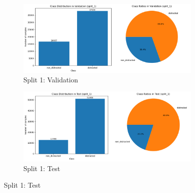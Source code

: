 \begin{figure}[htbp]
    \begin{subfigure}[b]{0.45\textwidth}
        \includegraphics[width=\textwidth]{Images_Thesis/class_distribution_Kinect_color/split_1_rgb_daa/class_dist_val_sp_1_rgb_daa.png}
        \caption{Split 1: Validation}
        \label{fig:Class_dist_grid_image5}
    \end{subfigure}
    \hfill
    \begin{subfigure}[b]{0.45\textwidth}
        \includegraphics[width=\textwidth]{Images_Thesis/class_distribution_Kinect_color/split_1_rgb_daa/class_dist_test_sp_1_rgb_daa.png}
        \caption{Split 1: Test}
        \label{fig:Class_dist_grid_image6}
    \end{subfigure}


\end{figure}
